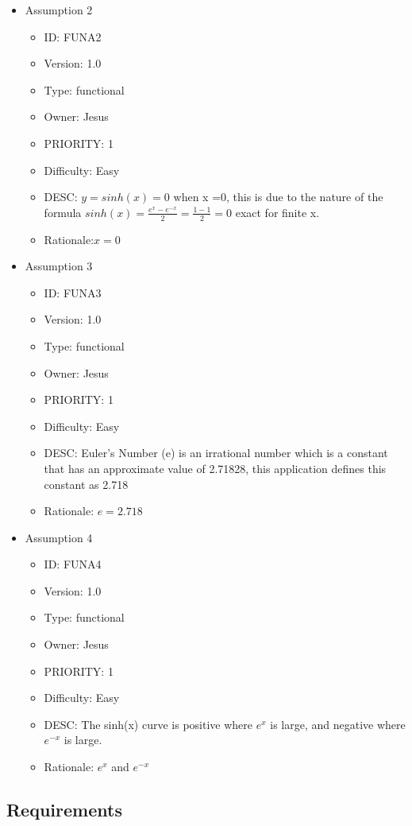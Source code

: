 \documentclass[12pt]{report}
\begin{document}
\begin{itemize}
\begin{itemize}
\end{itemize}
\item Assumption 2
\begin{itemize}
\item ID:       FUNA2
\item Version:  1.0
\item Type:     functional
\item Owner:    Jesus
\item PRIORITY: 1 
\item Difficulty: Easy
\item DESC: $y=sinh(x) =0$ when x =0, this is due to the nature of the formula $sinh(x)= \frac{e^x- e^{-x}}{2} = \frac{1 - 1}{2}=0$ exact for finite x.
\item Rationale:$x=0$
\end{itemize}
\pagebreak
\item Assumption 3
\begin{itemize}
\item ID:       FUNA3
\item Version:  1.0
\item Type:     functional
\item Owner:    Jesus
\item PRIORITY: 1 
\item Difficulty: Easy
\item DESC: Euler's Number (e) is an irrational number which is a constant that has an approximate value of 2.71828, this application defines this constant as 2.718
\item Rationale: $e=2.718$
\end{itemize}
\item Assumption 4
\begin{itemize}
\item ID:       FUNA4
\item Version:  1.0
\item Type:     functional
\item Owner:    Jesus
\item PRIORITY: 1 
\item Difficulty: Easy
\item DESC: The sinh(x) curve is positive where $e^{x}$ is large, and negative where $e^{-x}$ is large.
\item Rationale: $e^{x}$ and $e^{-x}$
\end{itemize}
\end{itemize}

\pagebreak
\subsection{Requirements}
\end{document}
